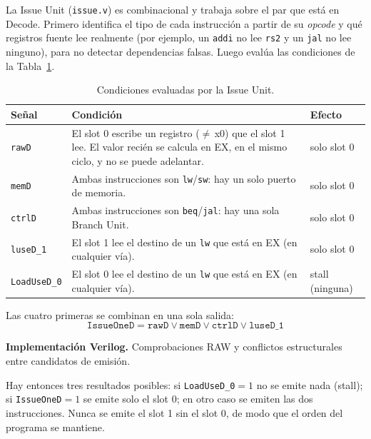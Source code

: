 \documentclass[12pt,a4paper]{article}
\begin{document}
La Issue Unit (\texttt{issue.v}) es combinacional y trabaja sobre el par que está en Decode. Primero identifica el tipo de cada instrucción a partir de su \textit{opcode} y qué registros fuente lee realmente (por ejemplo, un \texttt{addi} no lee \texttt{rs2} y un \texttt{jal} no lee ninguno), para no detectar dependencias falsas. Luego evalúa las condiciones de la Tabla~\ref{tab:issue}.

\begin{table}[H]
\centering
\small
\begin{tabularx}{\linewidth}{lXl}
\toprule
\textbf{Señal} & \textbf{Condición} & \textbf{Efecto} \\
\midrule
\texttt{rawD} & El slot 0 escribe un registro ($\neq$\,x0) que el slot 1 lee. El valor recién se calcula en EX, en el mismo ciclo, y no se puede adelantar. & solo slot 0 \\
\texttt{memD} & Ambas instrucciones son \texttt{lw}/\texttt{sw}: hay un solo puerto de memoria. & solo slot 0 \\
\texttt{ctrlD} & Ambas instrucciones son \texttt{beq}/\texttt{jal}: hay una sola Branch Unit. & solo slot 0 \\
\texttt{luseD\_1} & El slot 1 lee el destino de un \texttt{lw} que está en EX (en cualquier vía). & solo slot 0 \\
\texttt{LoadUseD\_0} & El slot 0 lee el destino de un \texttt{lw} que está en EX (en cualquier vía). & stall (ninguna) \\
\bottomrule
\end{tabularx}
\caption{Condiciones evaluadas por la Issue Unit.}
\label{tab:issue}
\end{table}

\noindent Las cuatro primeras se combinan en una sola salida:
\begin{equation}
\texttt{IssueOneD} = \texttt{rawD} \lor \texttt{memD} \lor \texttt{ctrlD} \lor \texttt{luseD\_1}
\end{equation}


\begin{samepage}
\noindent\textbf{Implementación Verilog.} Comprobaciones RAW y conflictos estructurales entre candidatos de emisión.
\end{samepage}


\noindent Hay entonces tres resultados posibles: si \texttt{LoadUseD\_0}$=1$ no se emite nada (stall); si \texttt{IssueOneD}$=1$ se emite solo el slot 0; en otro caso se emiten las dos instrucciones. Nunca se emite el slot 1 sin el slot 0, de modo que el orden del programa se mantiene.
\end{document}

